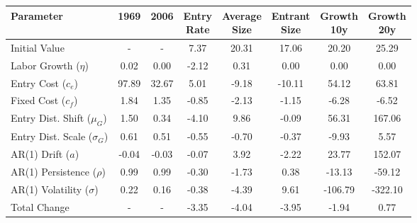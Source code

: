 \begin{tabular}{lccccccc}
\toprule
Parameter & 1969 & 2006 & \thead{Entry\\Rate} & \thead{Average\\Size} & \thead{Entrant\\Size} & \thead{Growth\\10y} & \thead{Growth\\20y} \\
\midrule
Initial Value & - & - & 7.37 & 20.31 & 17.06 & 20.20 & 25.29 \\
Labor Growth ($\eta$) & 0.02 & 0.00 & -2.12 & 0.31 & 0.00 & 0.00 & 0.00 \\
Entry Cost ($c_e$) & 97.89 & 32.67 & 5.01 & -9.18 & -10.11 & 54.12 & 63.81 \\
Fixed Cost ($c_f$) & 1.84 & 1.35 & -0.85 & -2.13 & -1.15 & -6.28 & -6.52 \\
Entry Dist. Shift ($\mu_G$) & 1.50 & 0.34 & -4.10 & 9.86 & -0.09 & 56.31 & 167.06 \\
Entry Dist. Scale ($\sigma_G$) & 0.61 & 0.51 & -0.55 & -0.70 & -0.37 & -9.93 & 5.57 \\
AR(1) Drift ($a$) & -0.04 & -0.03 & -0.07 & 3.92 & -2.22 & 23.77 & 152.07 \\
AR(1) Persistence ($\rho$) & 0.99 & 0.99 & -0.30 & -1.73 & 0.38 & -13.13 & -59.12 \\
AR(1) Volatility ($\sigma$) & 0.22 & 0.16 & -0.38 & -4.39 & 9.61 & -106.79 & -322.10 \\
Total Change & - & - & -3.35 & -4.04 & -3.95 & -1.94 & 0.77 \\
\bottomrule
\end{tabular}
